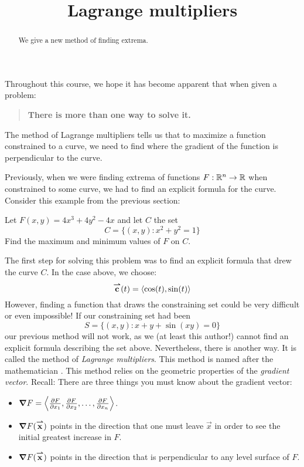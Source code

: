 \documentclass{ximera}
\title[Dig-In:]{Lagrange multipliers}
\begin{document}
\begin{abstract}
  We give a new method of finding extrema.
\end{abstract}
\maketitle

Throughout this course, we hope it has become apparent that when given
a problem:
\begin{quote}
  \textbf{There is more than one way to solve it.}
\end{quote}
The method of Lagrange multipliers tells us that to maximize a
function constrained to a curve, we need to find where the gradient of
the function is perpendicular to the curve.

Previously, when we were finding extrema of functions $F:\R^n\to\R$
when constrained to some curve, we had to find an explicit formula for
the curve. Consider this example from the previous section:

\begin{example}
Let $F(x,y) = 4x^3+4y^2-4x$ and let $C$ the set
\[
C = \{(x,y):x^2 + y^2 =1\}
\]
Find the maximum and minimum values of $F$ on $C$.
\end{example}

The first step for solving this problem was to find an explicit
formula that drew the curve $C$. In the case above, we choose:
\[
\vec{c}(t) = \vector{\cos(t),\sin(t)}
\]
However, finding a function that draws the constraining set could be
very difficult or even impossible! If our constraining set had been
\[
S = \{(x,y): x+y+\sin(xy) =0\}
\]
our previous method will not work, as we (at least this author!)
cannot find an explicit formula describing the set
above. Nevertheless, there is another way. It is called the method of
\textit{Lagrange multipliers}. This method is named after the
mathematician . This
method relies on the geometric properties of the \textit{gradient
  vector}. Recall: There are three things you must know about the
gradient vector:
\begin{itemize}
\item $\grad F = \vector{\pp[F]{x_1},\pp[F]{x_2},\dots,\pp[F]{x_n}}$.
\item $\grad F(\vec{x})$ points in the direction that one must leave
  $\vec{x}$ in order to see the initial greatest increase in $F$.
\item $\grad F(\vec{x})$ points in the direction that is perpendicular
  to any level surface of $F$.
\end{itemize}
\end{document}

